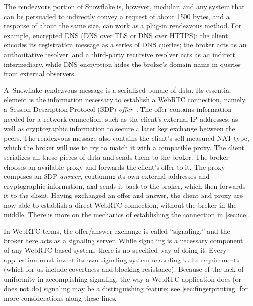\documentclass[letterpaper,twocolumn]{article}
\begin{document}
The rendezvous portion of Snowflake is, however, modular,
and any system that can be persuaded to indirectly convey a request
of about 1500 bytes, and a response of about the same size,
can work as a plug-in rendezvous method.
For example, encrypted DNS
(DNS over TLS or DNS over HTTPS):
the client encodes its registration message as a series of DNS queries;
the broker acts as an authoritative resolver;
and a third-party recursive resolver acts as an indirect intermediary,
while DNS encryption hides the broker's domain name in queries
from external observers.

A~Snowflake rendezvous message is a serialized bundle of data.
Its essential element
is the information necessary to establish a WebRTC connection,
namely a Session Description Protocol (SDP) \emph{offer}~\cite[\S 5]{rfc8839}.
The offer contains information needed for a network connection,
such as the client's external IP addresses;
as well as cryptographic information to secure a later key exchange between the peers.
The rendezvous message also contains the client's
self-measured NAT type, which the broker will use to try to match it
with a compatible proxy.
The client serializes all these pieces of data and sends them to the broker.
The broker chooses an available proxy
and forwards the client's offer to it.
The proxy composes an SDP \emph{answer},
containing its own external addresses and cryptographic information,
and sends it back to the broker,
which then forwards it to the client.
Having exchanged an offer and answer,
the client and proxy are now able to establish a direct WebRTC connection,
without the broker in the middle.
There is more on the mechanics of establishing the connection
in \autoref{sec:ice}.

In WebRTC terms, the offer/answer exchange is called
``signaling,'' and the broker here acts as a signaling server.
While signaling is a necessary component
of any WebRTC-based system,
there is no specified way of doing it.
Every application must invent its own signaling system
according to its requirements
(which for us include covertness and blocking resistance).
Because of the lack of uniformity in accomplishing signaling,
the way a WebRTC application does (or does not do) signaling
may be a distinguishing feature; see \autoref{sec:fingerprinting}
for more considerations along these lines.
\end{document}
